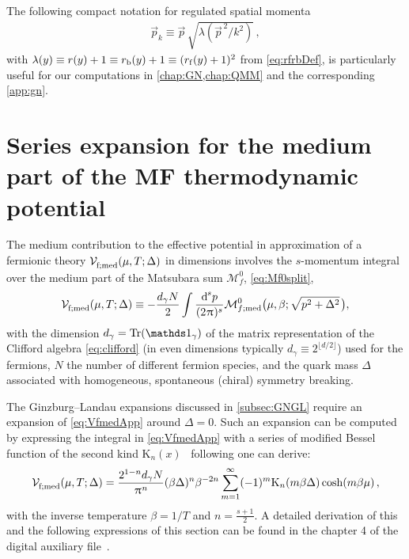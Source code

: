 The following compact notation for regulated spatial momenta
\begin{align}
\vec{p}_{k}\equiv \vec{p}\, \sqrt{\lambda(\vec{p}^{\, 2}/k^2)}\,,
\label{eq:pkReg}
\end{align}
with $\lambda(y)\equiv r(y)+1\equiv r_\mathrm{b}(y)+1\equiv(r_\mathrm{f}(y)+1)^2$ from \cref{eq:rfrbDef}, is particularly useful for our \frg{} computations in \cref{chap:GN,chap:QMM} and the corresponding \cref{app:gn}.

\section{Series expansion for the medium part of the MF thermodynamic potential}\label{app:seriesV}
The medium contribution to the effective potential in \mf{} approximation of a fermionic theory $\VeffArgs[\mathrm{f};\med]{\muT;\Delta}$ in  dimensions involves the $s$-momentum integral over the medium part of the Matsubara sum $\mathcal{M}_{f}^0$, \cf{} \cref{eq:Mf0split}, 
\begin{align}
	\VeffArgs[\mathrm{f};\med]{\muT;\Delta}\equiv -\frac{d_\gamma N}{2}\int\frac{\dif^{\,s}\! p}{(2\piu)^s}\mathcal{M}_{f;\med}^0\big(\mu,\beta;\sqrt{p^2+\Delta^2}\mkern2mu\big),\label{eq:VfmedApp}
\end{align}
with the dimension $d_\gamma=\Tr(\Id_\gamma)$ of the matrix representation of the Clifford algebra \eqref{eq:clifford} (in even dimensions typically ${d_\gamma\equiv 2^{\lfloor d/2\rfloor}}$) used for the fermions, $N$ the number of different fermion species, and the quark mass $\Delta$ associated with homogeneous, spontaneous (chiral) symmetry breaking.

The Ginzburg–Landau expansions discussed in \cref{subsec:GNGL} require an expansion of \cref{eq:VfmedApp} around $\Delta=0$. Such an expansion can be computed by expressing the integral in \cref{eq:VfmedApp} with a series of modified Bessel function of the second kind $\mathrm{K}_n(x)$~\cite{abramowitz+stegun,Mathematica:13.0} following  one can derive:
\begin{align}
	\VeffArgs[\mathrm{f};\med]{\muT;\Delta}=\frac{2^{1-n}d_\gamma N}{\piu^n}(\beta\Delta)^n \beta^{-2n}\sum_{m=1}^\infty (-1)^m\mathrm{K}_n(m \beta \Delta)\cosh(m \beta \mu)\, ,\label{eq:VfmedBesselApp}
\end{align}
with the inverse temperature $\beta=1/T$ and $n=\tfrac{s+1}{2}$.
A detailed derivation of this and the following expressions of this section can be found in the chapter 4 of the digital auxiliary file~\cite{Steil:2023PhDThermodynamicsNB}.

